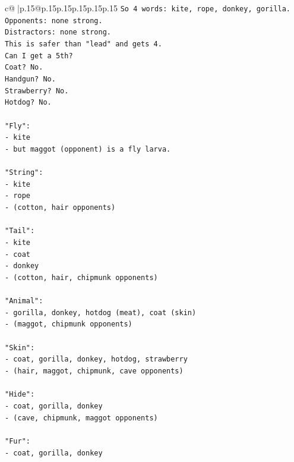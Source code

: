 \documentclass{article}
\begin{document}
{\begin{supertabular}{c@{$\;$}|p{.15\linewidth}@{}p{.15\linewidth}p{.15\linewidth}p{.15\linewidth}p{.15\linewidth}p{.15\linewidth}}
{{{\texttt{So 4 words: kite, rope, donkey, gorilla.} \\
\texttt{Opponents: none strong.} \\
\texttt{Distractors: none strong.} \\
\texttt{This is safer than "lead" and gets 4.} \\
\texttt{Can I get a 5th?} \\
\texttt{Coat? No.} \\
\texttt{Handgun? No.} \\
\texttt{Strawberry? No.} \\
\texttt{Hotdog? No.} \\
\\ 
\texttt{"Fly":} \\
\texttt{{-} kite} \\
\texttt{{-} but maggot (opponent) is a fly larva.} \\
\\ 
\texttt{"String":} \\
\texttt{{-} kite} \\
\texttt{{-} rope} \\
\texttt{{-} (cotton, hair opponents)} \\
\\ 
\texttt{"Tail":} \\
\texttt{{-} kite} \\
\texttt{{-} coat  } \\
\texttt{{-} donkey} \\
\texttt{{-} (cotton, hair, chipmunk opponents)} \\
\\ 
\texttt{"Animal":} \\
\texttt{{-} gorilla, donkey, hotdog (meat), coat (skin)} \\
\texttt{{-} (maggot, chipmunk opponents)} \\
\\ 
\texttt{"Skin":} \\
\texttt{{-} coat, gorilla, donkey, hotdog, strawberry} \\
\texttt{{-} (hair, maggot, chipmunk, cave opponents)} \\
\\ 
\texttt{"Hide":} \\
\texttt{{-} coat, gorilla, donkey} \\
\texttt{{-} (cave, chipmunk, maggot opponents)} \\
\\ 
\texttt{"Fur":} \\
\texttt{{-} coat, gorilla, donkey} \\
}}}
\end{supertabular}}
\end{document}
